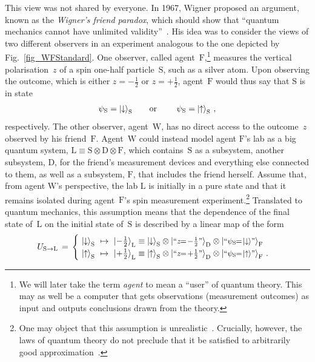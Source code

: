 \documentclass{article}
\theoremstyle{mystyle}
\theoremstyle{definition}
\newcommand*{\ket}[1]{{| #1 \rangle}}
\newcommand*{\Friend}{\mathrm{F}}
\newcommand*{\Lab}{\mathrm{L}}
\newcommand*{\Wigner}{\mathrm{W}}
\newcommand*{\Spin}{\mathrm{S}}
\newcommand*{\spinup}{\ket{{\hspace{-0.1ex}\uparrow\hspace{-0.1ex}}}}
\newcommand*{\spindown}{\ket{{\hspace{-0.1ex}\downarrow\hspace{-0.1ex}}}}
\newcommand*{\sminus}{{\textstyle - \frac{1}{2}}}
\newcommand*{\splus}{{\textstyle + \frac{1}{2}}}
\begin{document}
This view was not shared by everyone.  In 1967, Wigner proposed an argument, known as the \emph{Wigner's friend paradox}, which should show that  ``quantum mechanics cannot have unlimited validity''~\cite{Wigner67}. His idea was to consider the views of two different observers  in an experiment analogous to the one depicted by Fig.~\ref{fig_WFStandard}. One observer, called agent~$\Friend$,\footnote{We will later take the term \emph{agent}  to mean a ``user'' of quantum theory. This may as well be a computer that gets observations (measurement outcomes) as input and outputs conclusions drawn from the theory.} measures the vertical polarisation~$z$ of a spin one-half particle~$\Spin$, such as a silver atom.  Upon observing the outcome, which is either  $z=\sminus$ or $z=\splus$, agent~$\Friend$ would thus say that  $\Spin$ is  in state
\begin{align} \label{eq_stateFriend}
  \psi_{\Spin} = \spindown_{\Spin} \qquad \text{or } \qquad \psi_{\Spin} = \spinup_{\Spin}   \ ,
\end{align} 
respectively.  The other observer, agent~$\Wigner$,   has no direct access to the outcome~$z$ observed by his friend~$\Friend$. Agent~$\Wigner$  could instead model agent $\Friend$'s lab  as a big quantum system, $\Lab \equiv \Spin \otimes \mathrm{D} \otimes \mathrm{F}$, which contains~$\Spin$ as a subsystem, another subsystem, $\mathrm{D}$, for the friend's measurement devices  and everything else connected to them, as well as a subsystem, $\mathrm{F}$, that includes the friend herself. Assume that, from agent $\Wigner$'s perspective, the lab $\Lab$ is initially in a pure state and that it remains isolated during agent~$\Friend$'s spin measurement experiment.\footnote{One may object that this assumption is unrealistic~\cite{Hepp72}. Crucially, however, the laws of quantum theory do not preclude that it be satisfied to arbitrarily good approximation~\cite{Bell75}.}  Translated to quantum mechanics, this assumption means that the  dependence of the final state of~$\Lab$ on the initial state of~$\Spin$ is described by a linear map  of the form 
\begin{align} \label{eq_Labstate}
   U_{\Spin \to \Lab} \, = \, \begin{cases}  \, \, \spindown_{\Spin} \, \,  \mapsto  \, \,  \ket{\sminus}_{\Lab}  \equiv \spindown_{\Spin} \otimes \ket{\text{\footnotesize ``$z \!\! = \! \sminus$''}}_{\mathrm{D}} \otimes \ket{\text{\footnotesize ``$\psi_{\Spin} \!\! = \! \spindown$''}}_{\mathrm{F}}  \\ 
   \, \, \spinup_{\Spin} \,  \, \mapsto \, \,  \ket{\splus}_{\Lab} \equiv \spinup_{\Spin} \otimes \ket{\text{\footnotesize ``$z \!\! = \! \splus$''}}_{\mathrm{D}} \otimes \ket{\text{\footnotesize ``$\psi_{\Spin} \!\!= \! \spinup$''}}_{\mathrm{F}} \ .   \end{cases} 
\end{align} 
\end{document}
